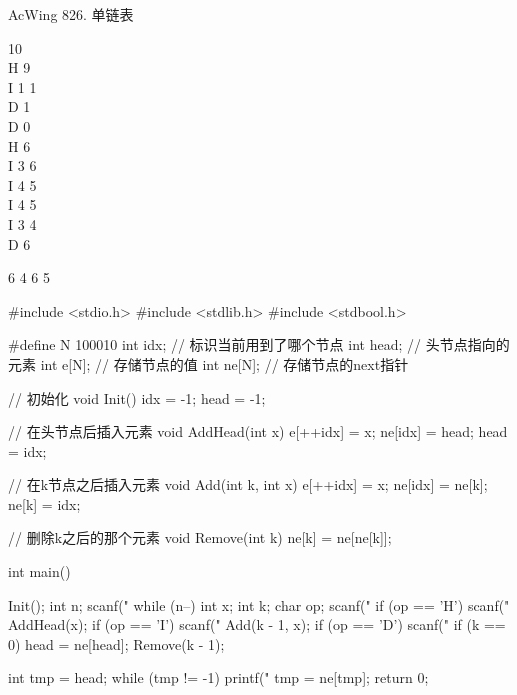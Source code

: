 \begin{titledbox}{AcWing 826. 单链表}
    \begin{inputblock}
        10 \\
        H 9 \\
        I 1 1 \\
        D 1 \\
        D 0 \\
        H 6 \\
        I 3 6 \\
        I 4 5 \\
        I 4 5 \\
        I 3 4 \\
        D 6
    \end{inputblock}
    \begin{outputblock}
        6 4 6 5
    \end{outputblock}
\end{titledbox}

\begin{mycpptwocol}
    #include <stdio.h>
    #include <stdlib.h>
    #include <stdbool.h>

    #define N 100010
    int idx; // 标识当前用到了哪个节点
    int head; // 头节点指向的元素
    int e[N]; // 存储节点的值
    int ne[N]; // 存储节点的next指针

    // 初始化
    void Init() {
        idx = -1;
        head = -1;
    }

    // 在头节点后插入元素
    void AddHead(int x) {
        e[++idx] = x;
        ne[idx] = head;
        head = idx;
    }

    // 在k节点之后插入元素
    void Add(int k, int x) {
        e[++idx] = x;
        ne[idx] = ne[k];
        ne[k] = idx;
    }

    // 删除k之后的那个元素
    void Remove(int k) {
        ne[k] = ne[ne[k]];
    }

    int main() {
        Init();
        int n;
        scanf("%
        while (n--) {
            int x;
            int k;
            char op;
            scanf(" %
            if (op == 'H') {
                scanf("%
                AddHead(x);
            }
            if (op == 'I') {
                scanf("%
                Add(k - 1, x);
            }
            if (op == 'D') {
                scanf("%
                if (k == 0) {
                    head = ne[head];
                }
                Remove(k - 1);
            }
        }

        int tmp = head;
        while (tmp != -1) {
            printf("%
            tmp = ne[tmp];
        }
        return 0;
    }
\end{mycpptwocol}


